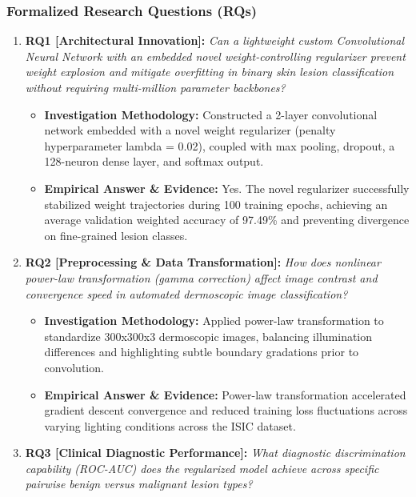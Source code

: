 \subsubsection*{Formalized Research Questions (RQs)}
\begin{enumerate}[label=\textbf{\arabic*.}, leftmargin=*]
  \item \textbf{RQ1 [Architectural Innovation]:} \textit{Can a lightweight custom Convolutional Neural Network with an embedded novel weight-controlling regularizer prevent weight explosion and mitigate overfitting in binary skin lesion classification without requiring multi-million parameter backbones?}
  \begin{itemize}[leftmargin=1.5em]
    \item \textbf{Investigation Methodology:} Constructed a 2-layer convolutional network embedded with a novel weight regularizer (penalty hyperparameter lambda = 0.02), coupled with max pooling, dropout, a 128-neuron dense layer, and softmax output.
    \item \textbf{Empirical Answer \& Evidence:} Yes. The novel regularizer successfully stabilized weight trajectories during 100 training epochs, achieving an average validation weighted accuracy of 97.49\% and preventing divergence on fine-grained lesion classes.
  \end{itemize}
  \item \textbf{RQ2 [Preprocessing \& Data Transformation]:} \textit{How does nonlinear power-law transformation (gamma correction) affect image contrast and convergence speed in automated dermoscopic image classification?}
  \begin{itemize}[leftmargin=1.5em]
    \item \textbf{Investigation Methodology:} Applied power-law transformation to standardize 300x300x3 dermoscopic images, balancing illumination differences and highlighting subtle boundary gradations prior to convolution.
    \item \textbf{Empirical Answer \& Evidence:} Power-law transformation accelerated gradient descent convergence and reduced training loss fluctuations across varying lighting conditions across the ISIC dataset.
  \end{itemize}
  \item \textbf{RQ3 [Clinical Diagnostic Performance]:} \textit{What diagnostic discrimination capability (ROC-AUC) does the regularized model achieve across specific pairwise benign versus malignant lesion types?}
  \begin{itemize}[leftmargin=1.5em]

\end{itemize}
\end{enumerate}
